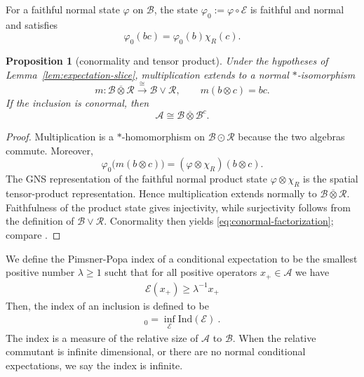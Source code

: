 \documentclass[a4paper,11pt]{article}
\newtheorem{proposition}[theorem]{Proposition}
\theoremstyle{definition}
\newcommand{\mA}{\mathcal{A}}
\newcommand{\mB}{\mathcal{B}}
\newcommand{\mE}{\mathcal{E}}
\begin{document}
For a faithful normal state $\varphi$ on $\mathcal B$, the state
$\varphi_0:=\varphi\circ \mE$ is faithful and normal and satisfies
\begin{equation}
 \varphi_0(b c)=\varphi_0(b)\chi_R(c).
\end{equation}

\begin{proposition}[conormality and tensor product]\label{prop:conormal-factorization}
Under the hypotheses of Lemma~\ref{lem:expectation-slice}, multiplication
extends to a normal $*$-isomorphism
\begin{equation}
 m:\mathcal B\overline\otimes\mathcal R
 \overset{\cong}{\longrightarrow}\mathcal B\vee\mathcal R,
 \qquad m(b\otimes c)=b c.
\end{equation}
If the inclusion is conormal, then
\begin{equation}\label{eq:conormal-factorization}
\mathcal A\cong
 \mathcal B\overline\otimes \mB^c .
\end{equation}
\end{proposition}

\begin{proof}
Multiplication is a $*$-homomorphism on $\mathcal B\odot\mathcal R$ because
the two algebras commute.  Moreover,
\begin{equation}
 \varphi_0\bigl(m(b\otimes c)\bigr)
 =(\varphi\otimes\chi_R)(b\otimes c).
\end{equation}
The GNS representation of the faithful normal product state
$\varphi\otimes\chi_R$ is the spatial tensor-product representation.  Hence
multiplication extends normally to $\mathcal B\overline\otimes\mathcal R$.
Faithfulness of the product state gives injectivity, while surjectivity follows
from the definition of $\mathcal B\vee\mathcal R$.  Conormality then yields
\eqref{eq:conormal-factorization}; compare
\cite{Faulkner2020,FaulknerSperanza2024}.
\end{proof}

We define the Pimsner-Popa index of a conditional expectation to be the smallest positive number $\lambda\geq 1$ sucht that for all positive operators $x_+\in \mA$ we have 
\begin{align}
    \mE(x_+)\geq \lambda^{-1}x_+
\end{align}
Then, the index of an inclusion is defined to be 
\begin{align}
    [\mA:\mB]_0=\inf_\mE \text{Ind}(\mE)\ .
\end{align}
The index is a measure of the relative size of $\mA$ to $\mB$. When the relative commutant is infinite dimensional, or there are no normal conditional expectations, we say the index is infinite.
\end{document}
